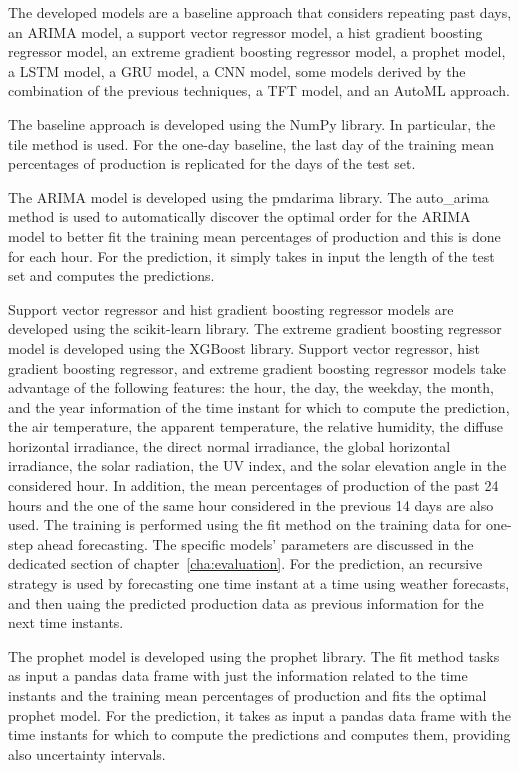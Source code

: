 The developed models are a baseline approach that considers repeating past days, an ARIMA model, a support vector regressor model, a hist gradient boosting regressor model, an extreme gradient boosting regressor model, a prophet model, a LSTM model, a GRU model, a CNN model, some models derived by the combination of the previous techniques, a TFT model, and an AutoML approach.

The baseline approach is developed using the NumPy library.
In particular, the tile method is used.
For the one-day baseline, the last day of the training mean percentages of production is replicated for the days of the test set.

The ARIMA model is developed using the pmdarima library.
The auto\_arima method is used to automatically discover the optimal order for the ARIMA model to better fit the training mean percentages of production and this is done for each hour.
For the prediction, it simply takes in input the length of the test set and computes the predictions.

Support vector regressor and hist gradient boosting regressor models are developed using the scikit-learn library.
The extreme gradient boosting regressor model is developed using the XGBoost library.
Support vector regressor, hist gradient boosting regressor, and extreme gradient boosting regressor models take advantage of the following features: the hour, the day, the weekday, the month, and the year information of the time instant for which to compute the prediction, the air temperature, the apparent temperature, the relative humidity, the diffuse horizontal irradiance, the direct normal irradiance, the global horizontal irradiance, the solar radiation, the UV index, and the solar elevation angle in the considered hour.
In addition, the mean percentages of production of the past 24 hours and the one of the same hour considered in the previous 14 days are also used.
The training is performed using the fit method on the training data for one-step ahead forecasting.
The specific models’ parameters are discussed in the dedicated section of chapter~\ref{cha:evaluation}.
For the prediction, an recursive strategy is used by forecasting one time instant at a time using weather forecasts, and then uaing the predicted production data as previous information for the next time instants.

The prophet model is developed using the prophet library.
The fit method tasks as input a pandas data frame with just the information related to the time instants and the training mean percentages of production and fits the optimal prophet model.
For the prediction, it takes as input a pandas data frame with the time instants for which to compute the predictions and computes them, providing also uncertainty intervals.

